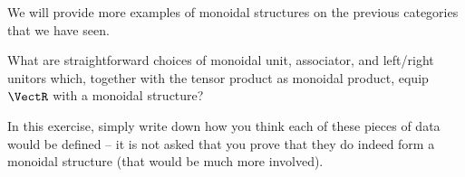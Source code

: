 \begin{publictodo}
    We will provide more examples of monoidal structures on the previous categories that we have seen.
\end{publictodo}

\begin{gradedexercise}
    \label{ex:VectTensorMonStructure}
    What are straightforward choices of monoidal unit, associator, and left/right unitors which, together with the tensor product as monoidal product, equip $\VectR$ with a monoidal structure?

    In this exercise, simply write down how you think each of these pieces of data would be defined -- it is not asked that you prove that they do indeed form a monoidal structure (that would be much more involved).
\end{gradedexercise}




